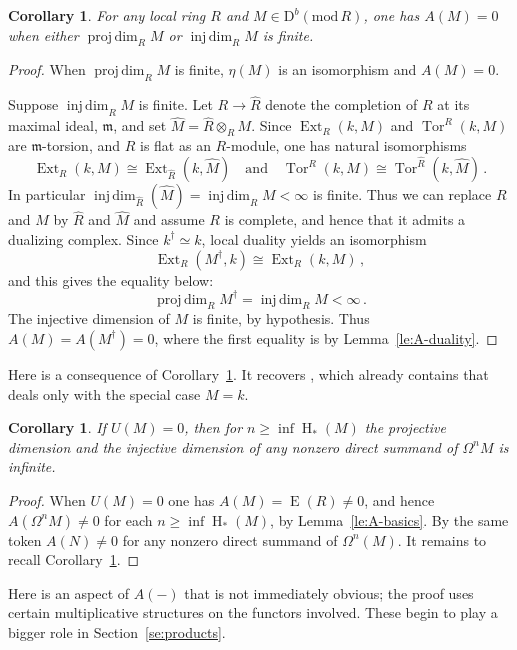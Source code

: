 \documentclass{amsart}
\numberwithin{equation}{section}
\theoremstyle{plain}
\newtheorem{corollary}[equation]{Corollary}
\theoremstyle{definition}
\theoremstyle{remark}
\newcommand{\dbcat}[1]{\mathrm{D}^b(\mathrm{mod}\,{#1})}
\newcommand{\eee}{\operatorname{E}}
\newcommand{\ext}{\operatorname{Ext}}
\newcommand{\hh}{\operatorname{H}}
\newcommand{\injdim}{\operatorname{inj\,dim}}
\newcommand{\projdim}{\operatorname{proj\,dim}}
\newcommand{\tor}{\operatorname{Tor}}
\newcommand{\fm}{\mathfrak{m}}
\begin{document}
\begin{corollary}
\label{co:A-fin-hom-dim} 
For any local ring $R$ and $M\in \dbcat R$, one has $A(M)=0$ when either $\projdim_RM$ or $\injdim_RM$ is finite.
\end{corollary}

\begin{proof}
When $\projdim_RM$ is finite, $\eta(M)$ is an isomorphism and $A(M)=0$. 

Suppose $\injdim_RM$ is finite. Let $R\to \widehat{R}$ denote the completion of $R$ at its maximal ideal, $\fm$, and set $\widehat{M}=\widehat{R}\otimes_RM$. Since $\ext_R(k,M)$ and $\tor^R(k,M)$ are $\fm$-torsion, and $\widehat{R}$ is flat as an $R$-module, one has natural isomorphisms 
\[
\ext_R(k,M)\cong \ext_{\widehat R}(k,\widehat{M})\quad\text{and}\quad
\tor^R(k,M)\cong \tor^{\widehat R}(k,\widehat{M})\,.
\]
In particular $\injdim_{\widehat{R}}(\widehat{M})=\injdim_RM <\infty$ is finite. Thus we can replace $R$ and $M$ by $\widehat{R}$ and $\widehat{M}$ and assume $R$ is complete, and hence that it admits a dualizing complex. Since $k^\dagger \simeq k$,
local duality yields an isomorphism
\[
\ext_R(M^\dagger,k)\cong \ext_R(k,M)\,,
\]
and this gives the equality below:
\[
\projdim_RM^{\dagger}=\injdim_RM <\infty\,.
\]
The injective dimension of $M$ is finite, by hypothesis. Thus $A(M)=A(M^\dagger)=0$, where the first equality is by Lemma~\ref{le:A-duality}.
\end{proof}

Here is a consequence of Corollary~\ref{co:A-fin-hom-dim}. It recovers \cite[1.7,1.8]{Lescot:1986}, which already contains \cite[Theorem III]{Ghosh/Gupta/Puthenpurakal:2018} that deals only with the special case $M=k$.

\begin{corollary}
\label{co:summands}
If $U(M)=0$, then for  $n\ge \inf\hh_*(M)$ the projective dimension and the injective dimension of any nonzero direct summand of $\Omega^nM$ is infinite.
\end{corollary}

\begin{proof}
When $U(M)=0$ one has $A(M)=\eee(R)\ne 0$, and hence $A(\Omega^nM)\ne 0$ for each $n\ge \inf\hh_*(M)$, by Lemma~\ref{le:A-basics}. By the same token $A(N)\ne 0$ for any nonzero direct summand of $\Omega^n(M)$. It remains to recall Corollary~\ref{co:A-fin-hom-dim}.
\end{proof}


Here is an aspect of $A(-)$ that is not immediately obvious; the proof uses certain multiplicative structures on the functors involved. These begin to play a bigger role in Section~\ref{se:products}.
\end{document}
